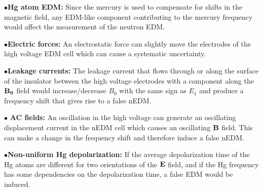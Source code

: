 \begin{description}
\item{$\bullet$\bf{Hg atom EDM:}} Since the mercury is used to
  compensate for shifts in the magnetic field, any EDM-like component
  contributing to the mercury frequency would affect the measurement
  of the neutron EDM.

\item{$\bullet$\bf{Electric forces:}} An electrostatic force can
  slightly move the electrodes of the high voltage EDM cell which can
  cause a systematic uncertainty.

\item{$\bullet$\bf{Leakage currents:}} The leakage current that flows
  through or along the surface of the insulator between the high
  voltage electrodes with a component along the $\bf{B_0}$ field would
  increase/decrease $B_0$ with the same sign as $E_1$ and produce a
  frequency shift that gives rise to a false nEDM.

\item{$\bullet$ \bf{AC fields:}} An oscillation in the high voltage
  can generate an oscillating displacement current in the nEDM cell
  which causes an oscillating $\bf{B}$ field. This can make a change
  in the frequency shift and therefore induce a false nEDM.

\item{$\bullet$\bf{Non-uniform Hg depolarization:}} If the average
  depolarization time of the Hg atoms are different for two
  orientations of the $\bf{E}$ field, and if the Hg frequency has some
  dependencies on the depolarization time, a false EDM would be
  induced.

\end{description}





